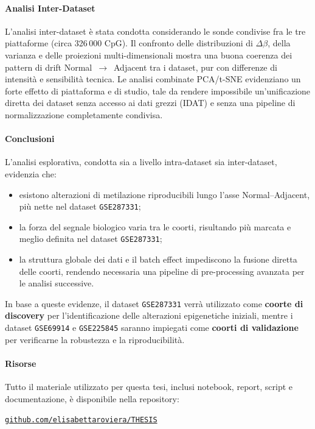 \documentclass[10pt]{extarticle}
\begin{document}
\paragraph{Analisi Inter-Dataset}
L’analisi inter-dataset è stata condotta considerando le sonde condivise fra le tre piattaforme (circa 326\,000 CpG).  
Il confronto delle distribuzioni di $\Delta\beta$, della varianza e delle proiezioni multi-dimensionali mostra una buona
coerenza dei pattern di drift Normal~$\rightarrow$~Adjacent tra i dataset, pur con differenze di intensità e sensibilità
tecnica. Le analisi combinate PCA/t-SNE evidenziano un forte effetto di piattaforma e di studio, tale da rendere
impossibile un’unificazione diretta dei dataset senza accesso ai dati grezzi (IDAT) e senza una pipeline di normalizzazione
completamente condivisa.

\paragraph{Conclusioni}
L’analisi esplorativa, condotta sia a livello intra-dataset sia inter-dataset, evidenzia che:
\begin{itemize}[label=-]
    \item esistono alterazioni di metilazione riproducibili lungo l’asse Normal--Adjacent, più nette nel dataset \texttt{GSE287331};
    \item la forza del segnale biologico varia tra le coorti, risultando più marcata e meglio definita nel dataset 
          \texttt{GSE287331};
    \item la struttura globale dei dati e il batch effect impediscono la fusione diretta delle coorti, rendendo necessaria
          una pipeline di pre-processing avanzata per le analisi successive.
\end{itemize}

In base a queste evidenze, il dataset \texttt{GSE287331} verrà utilizzato come \textbf{coorte di discovery} per 
l’identificazione delle alterazioni epigenetiche iniziali, mentre i dataset \texttt{GSE69914} e \texttt{GSE225845} 
saranno impiegati come \textbf{coorti di validazione} per verificarne la robustezza e la riproducibilità.

\paragraph{Risorse} Tutto il materiale utilizzato per questa tesi, inclusi notebook, report, script e documentazione,
è disponibile nella repository:
\begin{center}
\href{https://github.com/elisabettaroviera/THESIS}{\texttt{github.com/elisabettaroviera/THESIS}}
\end{center}
\end{document}
